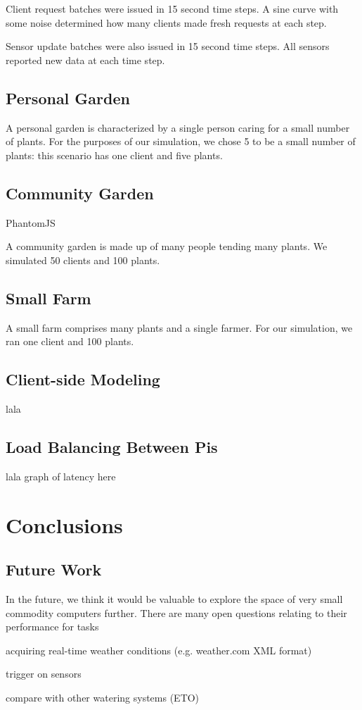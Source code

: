 \documentclass[a4paper]{acm_proc_article-sp}
\begin{document}
Client request batches were issued in 15 second time steps.  A sine curve with some noise determined how many clients made fresh requests at each step.

Sensor update batches were also issued in 15 second time steps.  All sensors reported new data at each time step.

\subsection{Personal Garden}

A personal garden is characterized by a single person caring for a small number of plants.  For the purposes of our simulation, we chose 5 to be a small number of plants: this scenario has one client and five plants.

\subsection{Community Garden}

PhantomJS

A community garden is made up of many people tending many plants.  We simulated 50 clients and 100 plants.

\subsection{Small Farm}

A small farm comprises many plants and a single farmer.  For our simulation, we ran one client and 100 plants.

\subsection{Client-side Modeling}

lala

\subsection{Load Balancing Between Pis}

lala
graph of latency here

\section{Conclusions}

\subsection{Future Work}

In the future, we think it would be valuable to explore the space of very small commodity computers further.  There are many open questions relating to their performance for tasks

acquiring real-time weather conditions (e.g. weather.com XML format)

trigger on sensors

compare with other watering systems (ETO)



\end{document}
